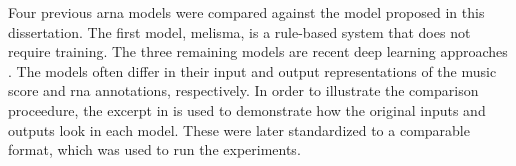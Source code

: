 
Four previous \gls{arna} models were compared against the
model proposed in this dissertation. The first model,
\gls{melisma}, is a rule-based system that does not require
training. The three remaining models are recent deep
learning approaches \parencite{chen2021attend,
micchi2021deep, mcleod2021modular}. The models often differ
in their input and output representations of the music score
and \gls{rna} annotations, respectively. In order to
illustrate the comparison proceedure, the excerpt in
 is used to demonstrate how the original
inputs and outputs look in each model. These were later
standardized to a comparable format, which was used to run
the experiments.

